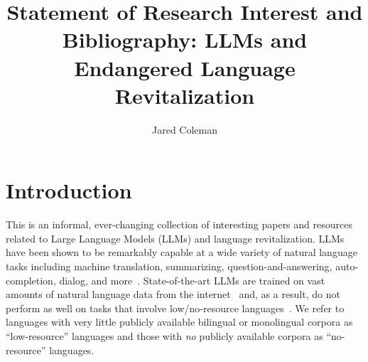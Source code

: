 \documentclass{article}
\title{Statement of Research Interest and Bibliography: LLMs and Endangered Language Revitalization}
\author{Jared Coleman}
\date{}
\begin{document}
\maketitle



\section*{Introduction}
This is an informal, ever-changing collection of interesting papers and resources related to Large Language Models (LLMs) and language revitalization.
LLMs have been shown to be remarkably capable at a wide variety of natural language tasks including machine translation, summarizing, question-and-answering, auto-completion, dialog, and more~\cite{gpt:agi}.
State-of-the-art LLMs are trained on vast amounts of natural language data from the internet~\cite{gpt:gpt4-tech-report} and, as a result, do not perform as well on tasks that involve low/no-resource languages~\cite{palm,gpt:low-resource-translation}.
We refer to languages with very little publicly available bilingual or monolingual corpora as ``low-resource'' languages and those with \textit{no} publicly available corpora as ``no-resource'' languages.
\end{document}
